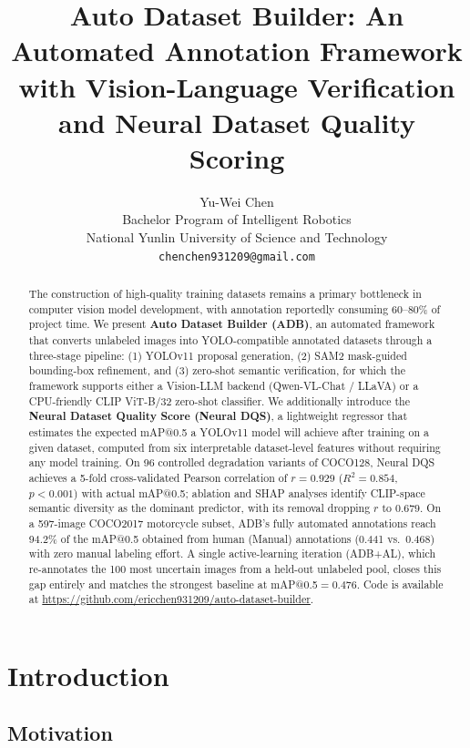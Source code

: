 \documentclass[11pt]{article}
\title{\textbf{Auto Dataset Builder: An Automated Annotation Framework\\
with Vision-Language Verification and Neural Dataset Quality Scoring}}
\author{
Yu-Wei Chen \\
Bachelor Program of Intelligent Robotics \\
National Yunlin University of Science and Technology \\
\texttt{chenchen931209@gmail.com}
}
\date{}
\begin{document}
\maketitle

\begin{abstract}
The construction of high-quality training datasets remains a primary bottleneck
in computer vision model development, with annotation reportedly consuming
60--80\% of project time. We present \textbf{Auto Dataset Builder (ADB)}, an
automated framework that converts unlabeled images into YOLO-compatible
annotated datasets through a three-stage pipeline: (1) YOLOv11 proposal
generation, (2) SAM2 mask-guided bounding-box refinement, and (3) zero-shot
semantic verification, for which the framework supports either a Vision-LLM
backend (Qwen-VL-Chat / LLaVA) or a CPU-friendly CLIP ViT-B/32 zero-shot
classifier. We additionally introduce the \textbf{Neural Dataset Quality
Score (Neural DQS)}, a lightweight regressor that estimates the expected
mAP@0.5 a YOLOv11 model will achieve after training on a given dataset, computed from
six interpretable dataset-level features without requiring any model
training. On 96 controlled degradation variants of COCO128, Neural DQS
achieves a 5-fold cross-validated Pearson correlation of $r=0.929$
($R^2=0.854$, $p<0.001$) with actual mAP@0.5; ablation and SHAP analyses
identify CLIP-space semantic diversity as the dominant predictor, with its
removal dropping $r$ to $0.679$. On a 597-image COCO2017 motorcycle subset,
ADB's fully automated annotations reach 94.2\% of the mAP@0.5 obtained from
human (Manual) annotations (0.441 vs.\ 0.468) with zero manual labeling
effort. A single active-learning iteration (ADB+AL), which re-annotates the
100 most uncertain images from a held-out unlabeled pool, closes this gap
entirely and matches the strongest baseline at mAP@0.5$=0.476$. Code is
available at
\url{https://github.com/ericchen931209/auto-dataset-builder}.
\end{abstract}

\section{Introduction}

\subsection{Motivation}
\end{document}
